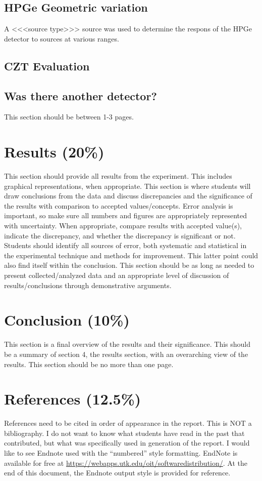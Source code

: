\documentclass[12pt]{article}
\begin{document}
\subsection{HPGe Geometric variation}
A <<<source type>>> source was used to determine the respons of the HPGe detector to sources at various ranges.

\subsection{CZT Evaluation}

\subsection{Was there another detector?}

This section should be between 1-3 pages.

\section{Results (20\%)}
This section should provide all results from the experiment. This includes graphical representations, when appropriate. This section is where students will draw conclusions from the data and discuss discrepancies and the significance of the results with comparison to accepted values/concepts. Error analysis is important, so make sure all numbers and figures are appropriately represented with uncertainty. When appropriate, compare results with accepted value(s), indicate the discrepancy, and whether the discrepancy is significant or not. Students should identify all sources of error, both systematic and statistical in the experimental technique and methods for improvement. This latter point could also find itself within the conclusion. This section should be as long as needed to present collected/analyzed data and an appropriate level of discussion of results/conclusions through demonstrative arguments.

\section{Conclusion (10\%)}
This section is a final overview of the results and their significance. This should be a summary of section 4, the results section, with an overarching view of the results. This section should be no more than one page.

\section{References (12.5\%)}
References need to be cited in order of appearance in the report. This is NOT a bibliography. I do not want to know what students have read in the past that contributed, but what was specifically used in generation of the report. I would like to see Endnote used with the “numbered” style formatting. EndNote is available for free at \url{https://webapps.utk.edu/oit/softwaredistribution/}. At the end of this document, the Endnote output style is provided for reference.
\end{document}
